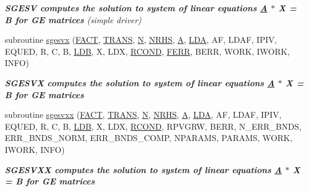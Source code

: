 \begin{DoxyCompactItemize}
\begin{DoxyCompactList}\small\item\em {\bfseries  S\+G\+E\+S\+V computes the solution to system of linear equations \hyperlink{classA}{A} $\ast$ X = B for G\+E matrices} (simple driver) \end{DoxyCompactList}\item 
subroutine \hyperlink{group__realGEsolve_ga1f66bf6cce2f8038b120eb11bd30cdc9}{sgesvx} (\hyperlink{superlu__enum__consts_8h_af00a42ecad444bbda75cde1b64bd7e72a1b6692b56d378abb85bd49063721d034}{F\+A\+C\+T}, \hyperlink{superlu__enum__consts_8h_a0c4e17b2d5cea33f9991ccc6a6678d62a1f61e3015bfe0f0c2c3fda4c5a0cdf58}{T\+R\+A\+N\+S}, \hyperlink{polmisc_8c_a0240ac851181b84ac374872dc5434ee4}{N}, \hyperlink{example__user_8c_aa0138da002ce2a90360df2f521eb3198}{N\+R\+H\+S}, \hyperlink{classA}{A}, \hyperlink{example__user_8c_ae946da542ce0db94dced19b2ecefd1aa}{L\+D\+A}, A\+F, L\+D\+A\+F, I\+P\+I\+V, E\+Q\+U\+E\+D, R, C, B, \hyperlink{example__user_8c_a50e90a7104df172b5a89a06c47fcca04}{L\+D\+B}, X, L\+D\+X, \hyperlink{superlu__enum__consts_8h_af00a42ecad444bbda75cde1b64bd7e72a9b5c151728d8512307565994c89919d5}{R\+C\+O\+N\+D}, \hyperlink{superlu__enum__consts_8h_af00a42ecad444bbda75cde1b64bd7e72a78fd14d7abebae04095cfbe02928f153}{F\+E\+R\+R}, B\+E\+R\+R, W\+O\+R\+K, I\+W\+O\+R\+K, I\+N\+F\+O)
\begin{DoxyCompactList}\small\item\em {\bfseries  S\+G\+E\+S\+V\+X computes the solution to system of linear equations \hyperlink{classA}{A} $\ast$ X = B for G\+E matrices} \end{DoxyCompactList}\item 
subroutine \hyperlink{group__realGEsolve_gad499b2a1b47541ff7f97aaaca16025e9}{sgesvxx} (\hyperlink{superlu__enum__consts_8h_af00a42ecad444bbda75cde1b64bd7e72a1b6692b56d378abb85bd49063721d034}{F\+A\+C\+T}, \hyperlink{superlu__enum__consts_8h_a0c4e17b2d5cea33f9991ccc6a6678d62a1f61e3015bfe0f0c2c3fda4c5a0cdf58}{T\+R\+A\+N\+S}, \hyperlink{polmisc_8c_a0240ac851181b84ac374872dc5434ee4}{N}, \hyperlink{example__user_8c_aa0138da002ce2a90360df2f521eb3198}{N\+R\+H\+S}, \hyperlink{classA}{A}, \hyperlink{example__user_8c_ae946da542ce0db94dced19b2ecefd1aa}{L\+D\+A}, A\+F, L\+D\+A\+F, I\+P\+I\+V, E\+Q\+U\+E\+D, R, C, B, \hyperlink{example__user_8c_a50e90a7104df172b5a89a06c47fcca04}{L\+D\+B}, X, L\+D\+X, \hyperlink{superlu__enum__consts_8h_af00a42ecad444bbda75cde1b64bd7e72a9b5c151728d8512307565994c89919d5}{R\+C\+O\+N\+D}, R\+P\+V\+G\+R\+W, B\+E\+R\+R, N\+\_\+\+E\+R\+R\+\_\+\+B\+N\+D\+S, E\+R\+R\+\_\+\+B\+N\+D\+S\+\_\+\+N\+O\+R\+M, E\+R\+R\+\_\+\+B\+N\+D\+S\+\_\+\+C\+O\+M\+P, N\+P\+A\+R\+A\+M\+S, P\+A\+R\+A\+M\+S, W\+O\+R\+K, I\+W\+O\+R\+K, I\+N\+F\+O)
\begin{DoxyCompactList}\small\item\em {\bfseries  S\+G\+E\+S\+V\+X\+X computes the solution to system of linear equations \hyperlink{classA}{A} $\ast$ X = B for G\+E matrices} \end{DoxyCompactList}\end{DoxyCompactItemize}


